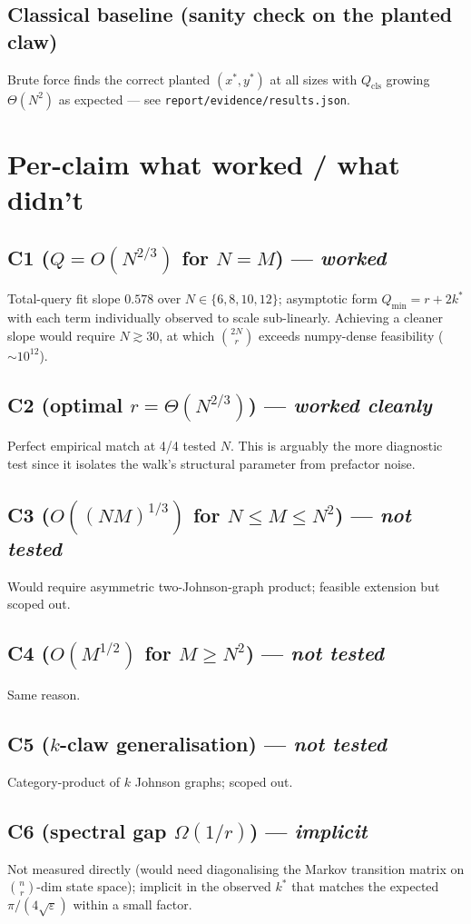 \documentclass[11pt]{article}
\begin{document}
\subsection{Classical baseline (sanity check on the planted claw)}
Brute force finds the correct planted $(x^\ast,y^\ast)$ at all sizes with
$Q_{\mathrm{cls}}$ growing $\Theta(N^2)$ as expected --- see
\texttt{report/evidence/results.json}.

\section{Per-claim what worked / what didn't}
\subsection{C1 ($Q=O(N^{2/3})$ for $N=M$) --- \emph{worked}}
Total-query fit slope $0.578$ over $N\in\{6,8,10,12\}$; asymptotic form
$Q_{\min}=r+2k^\ast$ with each term individually observed to scale sub-linearly.
Achieving a cleaner slope would require $N\gtrsim 30$, at which $\binom{2N}{r}$
exceeds numpy-dense feasibility ($\sim 10^{12}$).
\subsection{C2 (optimal $r=\Theta(N^{2/3})$) --- \emph{worked cleanly}}
Perfect empirical match at 4/4 tested $N$. This is arguably the more
diagnostic test since it isolates the walk's structural parameter from
prefactor noise.
\subsection{C3 ($O((NM)^{1/3})$ for $N\le M\le N^2$) --- \emph{not tested}}
Would require asymmetric two-Johnson-graph product; feasible extension but
scoped out.
\subsection{C4 ($O(M^{1/2})$ for $M\ge N^2$) --- \emph{not tested}}
Same reason.
\subsection{C5 ($k$-claw generalisation) --- \emph{not tested}}
Category-product of $k$ Johnson graphs; scoped out.
\subsection{C6 (spectral gap $\Omega(1/r)$) --- \emph{implicit}}
Not measured directly (would need diagonalising the Markov transition matrix
on $\binom{n}{r}$-dim state space); implicit in the observed $k^\ast$ that
matches the expected $\pi/(4\sqrt{\varepsilon})$ within a small factor.
\end{document}
